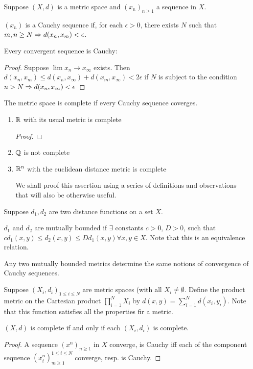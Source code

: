 
Suppose $(X,d)$ is a metric space and $(x_n)_{n\geq 1}$ a sequence in $X$.
\begin{mydef}
$(x_n)$ is a Cauchy sequence if, for each $\epsilon > 0$, there exists $N$ such that $m,n\geq N\Rightarrow d(x_n,x_m)<\epsilon$.
\end{mydef}
\begin{rem}
Every convergent sequence is Cauchy:
\begin{proof}
Suppose $\lim x_n\to x_\infty$ exists. Then $d(x_n,x_m)\leq d(x_n,x_\infty) + d(x_m,x_\infty)<2\epsilon$ if $N$ is subject to the condition $n>N\Rightarrow d(x_n,x_\infty) < \epsilon$
\end{proof}
\end{rem}
\begin{mydef}
The metric space is complete if every Cauchy sequence coverges.
\end{mydef}
\begin{example}
\begin{enumerate}
\item $\mathbb{R}$ with its usual metric is complete
\begin{proof}
\homework
\end{proof}
\item $\mathbb{Q}$ is not complete
\item $\mathbb{R}^n$ with the euclidean distance metric is complete \par
We shall proof this assertion using a series of definitions and observations that will also be otherwise useful. \par
\end{enumerate}
\end{example}
Suppose $d_1,d_2$ are two distance functions on a set $X$.
\begin{mydef}
$d_1$ and $d_2$ are mutually bounded if $\exists$ constants $c>0$, $D>0$, such that $cd_1(x,y)\leq d_2(x,y) \leq Dd_1(x,y) \forall x,y\in X$. Note that this is an equivalence relation.
\end{mydef}
\begin{obs}
Any two mutually bounded metrics determine the same notions of convergence of Cauchy sequences. 
\end{obs}
Suppose $(X_i,d_i)_{1\leq i\leq N}$ are metric spaces (with all $X_i \neq \emptyset$. Define the product metric on the Cartesian product $\prod\limits_{i=1}^N X_i$ by $d(x,y)=\sum\limits_{i=1}^N d(x_i,y_i)$. Note that this function satisfies all the properties fir a metric.
\begin{obs}
$(X,d)$ is complete if and only if each $(X_i,d_i)$ is complete. 
\begin{proof}
A sequence $(x^n)_{n \geq 1}$ in $X$ converge, is Cauchy iff each of the component sequence $(x_i^n)_{m\geq 1}^{1\leq i\leq N}$ converge, resp. is Cauchy. 
\end{proof}
\end{obs}

